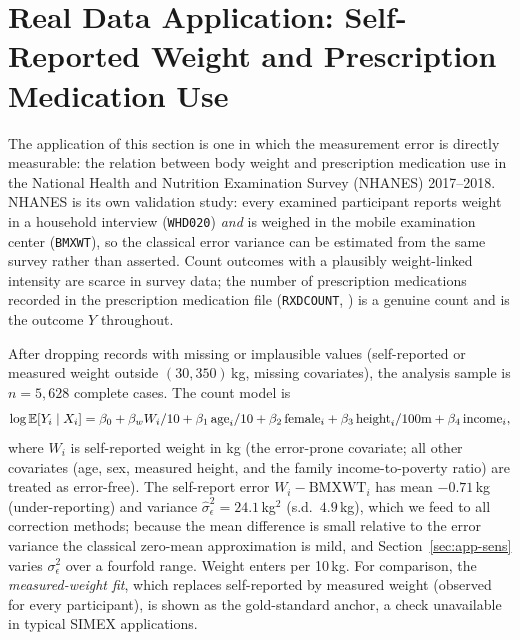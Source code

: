 
\section{Real Data Application: Self-Reported Weight and Prescription
Medication Use}\label{sec:app}

The application of this section is one in which the measurement error
is directly measurable: the relation between body weight and
prescription medication use in the National Health and Nutrition
Examination Survey (NHANES) 2017--2018.
NHANES is its own validation study: every examined participant reports
weight in a household interview (\texttt{WHD020}) \emph{and} is weighed
in the mobile examination center (\texttt{BMXWT}), so the classical
error variance can be estimated from the same survey rather than
asserted. Count outcomes with a plausibly weight-linked intensity are
scarce in survey data; the number of prescription medications recorded
in the prescription medication file (\texttt{RXDCOUNT},
\citep{nhanes-rxq}) is a genuine count and is the outcome
$Y$ throughout.

After dropping records with missing or implausible values (self-reported
or measured weight outside $(30,350)$\,kg, missing covariates), the
analysis sample is $n=5{,}628$ complete cases. The count model is
\begin{equation}
  \log\mathbb{E}[Y_i\mid X_i] = \beta_0 + \beta_w W_i/10
    + \beta_1\,\mathrm{age}_i/10 + \beta_2\,\mathrm{female}_i
    + \beta_3\,\mathrm{height}_i/100\mathrm{m}
    + \beta_4\,\mathrm{income}_i,
  \label{eq:nhanes}
\end{equation}
where $W_i$ is self-reported weight in kg (the error-prone covariate;
all other covariates (age, sex, measured height, and the family
income-to-poverty ratio) are treated as error-free). The self-report
error $W_i-\mathrm{BMXWT}_i$ has mean $-0.71$\,kg (under-reporting) and
variance $\hat\sigma^2_\epsilon = 24.1$\,kg$^2$ (s.d.\ $4.9$\,kg),
which we feed to all correction methods; because the mean difference is
small relative to the error variance the classical zero-mean
approximation is mild, and Section~\ref{sec:app-sens} varies
$\sigma^2_\epsilon$ over a fourfold range. Weight enters per 10\,kg.
For comparison, the \emph{measured-weight fit}, which replaces
self-reported by measured weight (observed for every participant), is shown
as the gold-standard anchor, a check unavailable in typical SIMEX
applications.

